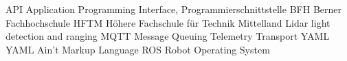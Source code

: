    {API}   {Application Programming Interface, Programmierschnittstelle}
   {BFH}   {Berner Fachhochschule}
  {HFTM}  {Höhere Fachschule für Technik Mittelland}
 {Lidar} {light detection and ranging}
  {MQTT}  {Message Queuing Telemetry Transport}
  {YAML}  {YAML Ain’t Markup Language}
   {ROS}   {Robot Operating System}
